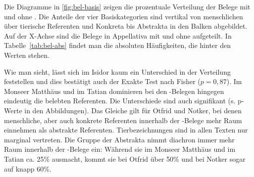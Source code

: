 Die Diagramme in \ref{fig:bel-basis} zeigen die prozentuale Verteilung der Belege mit und ohne  . Die Anteile der vier Basiskategorien sind vertikal von menschlichen über tierische Referenten und Konkreta bis Abstrakta in den Balken abgebildet. Auf der X-Achse sind die Belege in Appellativa mit   und ohne   aufgeteilt.  In Tabelle~\ref{tab:bel-abs} findet man die absoluten Häufigkeiten, die hinter den Werten stehen.

Wie man sieht, lässt sich im Isidor kaum ein Unterschied in der Verteilung feststellen und dies bestätigt auch der Exakte Test nach Fisher ($p = 0,87$). Im Monseer Matthäus und im Tatian dominieren bei den -Belegen hingegen eindeutig die belebten Referenten. Die Unterschiede sind auch signifikant (s. p-Werte in den Abbildungen). Das Gleiche gilt für Otfrid und Notker, bei denen menschliche, aber auch konkrete Referenten innerhalb der -Belege mehr Raum einnehmen als abstrakte Referenten. Tierbezeichnungen sind in allen Texten nur marginal vertreten. Die Gruppe der Abstrakta nimmt diachron immer mehr Raum innerhalb der -Belege ein: Während sie im Monseer Matthäus und im Tatian ca. 25\% ausmacht, kommt sie bei Otfrid über 50\% und bei Notker sogar auf knapp 60\%. 

